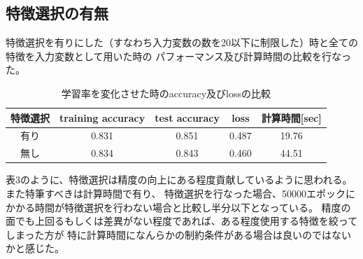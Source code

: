 \documentclass[uplatex]{jsarticle}
\begin{document}
\subsection{特徴選択の有無}
特徴選択を有りにした（すなわち入力変数の数を20以下に制限した）時と全ての特徴を入力変数として用いた時の
パフォーマンス及び計算時間の比較を行なった。
\begin{table}[htb]
  \centering
  \caption{学習率を変化させた時のaccuracy及びlossの比較}
  \begin{tabular}{|c||c|c|c|c|} \hline
    特徴選択 & training accuracy &  test accuracy & loss & 計算時間[sec]\\ \hline \hline
    有り & 0.831 & 0.851 & 0.487 & 19.76 \\ \hline
    無し & 0.834 & 0.843 & 0.460 & 44.51 \\ \hline
  \end{tabular}
\end{table}
表3のように、特徴選択は精度の向上にある程度貢献しているように思われる。また特筆すべきは計算時間で有り、
特徴選択を行なった場合、50000エポックにかかる時間が特徴選択を行わない場合と比較し半分以下となっている。
精度の面でも上回るもしくは差異がない程度であれば、ある程度使用する特徴を絞ってしまった方が
特に計算時間になんらかの制約条件がある場合は良いのではないかと感じた。

\end{document}
